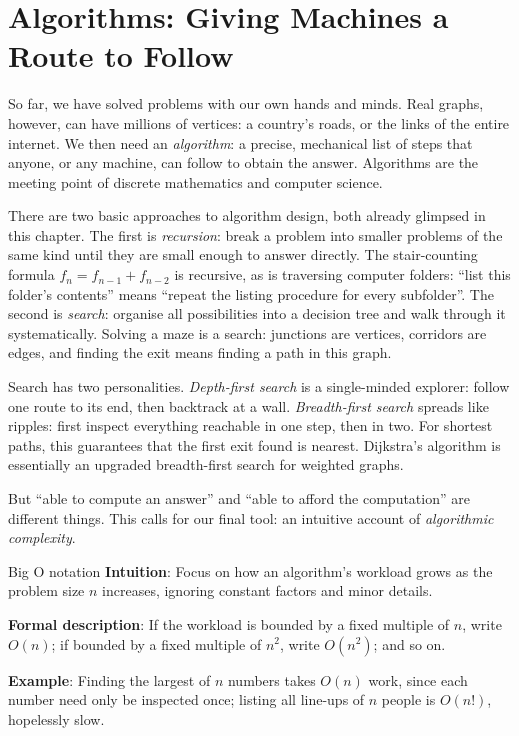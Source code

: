 \section{Algorithms: Giving Machines a Route to Follow}

So far, we have solved problems with our own hands and minds. Real graphs, however, can have millions of vertices: a country's roads, or the links of the entire internet. We then need an \emph{algorithm}: a precise, mechanical list of steps that anyone, or any machine, can follow to obtain the answer. Algorithms are the meeting point of discrete mathematics and computer science.

There are two basic approaches to algorithm design, both already glimpsed in this chapter. The first is \emph{recursion}: break a problem into smaller problems of the same kind until they are small enough to answer directly. The stair-counting formula $f_n=f_{n-1}+f_{n-2}$ is recursive, as is traversing computer folders: ``list this folder's contents'' means ``repeat the listing procedure for every subfolder''. The second is \emph{search}: organise all possibilities into a decision tree and walk through it systematically. Solving a maze is a search: junctions are vertices, corridors are edges, and finding the exit means finding a path in this graph.

Search has two personalities. \emph{Depth-first search} is a single-minded explorer: follow one route to its end, then backtrack at a wall. \emph{Breadth-first search} spreads like ripples: first inspect everything reachable in one step, then in two. For shortest paths, this guarantees that the first exit found is nearest. Dijkstra's algorithm is essentially an upgraded breadth-first search for weighted graphs.

But ``able to compute an answer'' and ``able to afford the computation'' are different things. This calls for our final tool: an intuitive account of \emph{algorithmic complexity}.

\begin{shuyu}{Big O notation}
\textbf{Intuition}: Focus on how an algorithm's workload grows as the problem size $n$ increases, ignoring constant factors and minor details.

\textbf{Formal description}: If the workload is bounded by a fixed multiple of $n$, write $O(n)$; if bounded by a fixed multiple of $n^2$, write $O(n^2)$; and so on.

\textbf{Example}: Finding the largest of $n$ numbers takes $O(n)$ work, since each number need only be inspected once; listing all line-ups of $n$ people is $O(n!)$, hopelessly slow.
\end{shuyu}

